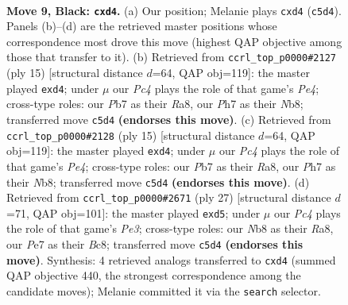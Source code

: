 \documentclass[11pt]{article}
\begin{document}
\clearpage

\begin{figure}[p]\centering
\begin{subfigure}{0.46\textwidth}\centering
\resizebox{\linewidth}{!}{%
\newchessgame
\chessboard[
  setfen={rnbqk2r/pp2p1bp/5pp1/2p5/3PPPPP/2P5/P7/R1BQKBNR b KQkq - 0 9},
  showmover=false,
  pgfstyle=straightmove, color=movearrow, markmove={c5-d4}
]}
\caption{}
\end{subfigure}\hfill
\begin{subfigure}{0.46\textwidth}\centering
\resizebox{\linewidth}{!}{%
\newchessgame
\chessboard[
  setfen={rn1qkb1r/pbp2ppp/1p6/4p3/2BPP3/2P2P2/P5PP/R1BQK1NR b KQkq - 1 8},
  showmover=false,
  pgfstyle=straightmove, color=movearrow, markmove={e5-d4}
]}
\caption{}
\end{subfigure}
\\[4pt]
\begin{subfigure}{0.46\textwidth}\centering
\resizebox{\linewidth}{!}{%
\newchessgame
\chessboard[
  setfen={rn1qkb1r/pbp2ppp/1p6/4p3/2BPP3/2P2P2/P5PP/R1BQK1NR b KQkq - 1 8},
  showmover=false,
  pgfstyle=straightmove, color=movearrow, markmove={e5-d4}
]}
\caption{}
\end{subfigure}\hfill
\begin{subfigure}{0.46\textwidth}\centering
\resizebox{\linewidth}{!}{%
\newchessgame
\chessboard[
  setfen={r1bq1rk1/ppb2p1p/4p1p1/2pP4/4PP2/2P5/P2QB1PP/1RB2RK1 b - - 2 14},
  showmover=false,
  pgfstyle=straightmove, color=movearrow, markmove={e6-d5}
]}
\caption{}
\end{subfigure}
\caption{\textbf{Move 9, Black: \texttt{cxd4}.} (a) Our position; Melanie plays \texttt{cxd4} (\texttt{c5d4}). Panels (b)--(d) are the retrieved master positions whose correspondence most drove this move (highest QAP objective among those that transfer to it). (b) Retrieved from \texttt{ccrl\_top\_p0000\#2127} (ply 15) [structural distance $d$=64, QAP obj=119]: the master played \texttt{exd4}; under $\mu$ our \emph{Pc4} plays the role of that game's \emph{Pe4}; cross-type roles: our \emph{P}b7 as their \emph{R}a8, our \emph{P}h7 as their \emph{N}b8; transferred move \texttt{c5d4} \textbf{(endorses this move)}. (c) Retrieved from \texttt{ccrl\_top\_p0000\#2128} (ply 15) [structural distance $d$=64, QAP obj=119]: the master played \texttt{exd4}; under $\mu$ our \emph{Pc4} plays the role of that game's \emph{Pe4}; cross-type roles: our \emph{P}b7 as their \emph{R}a8, our \emph{P}h7 as their \emph{N}b8; transferred move \texttt{c5d4} \textbf{(endorses this move)}. (d) Retrieved from \texttt{ccrl\_top\_p0000\#2671} (ply 27) [structural distance $d$=71, QAP obj=101]: the master played \texttt{exd5}; under $\mu$ our \emph{Pc4} plays the role of that game's \emph{Pe3}; cross-type roles: our \emph{N}b8 as their \emph{R}a8, our \emph{P}e7 as their \emph{B}c8; transferred move \texttt{c5d4} \textbf{(endorses this move)}. Synthesis: 4 retrieved analogs transferred to \texttt{cxd4} (summed QAP objective 440, the strongest correspondence among the candidate moves); Melanie committed it via the \texttt{search} selector.}
\label{fig:thought-m17}
\end{figure}
\end{document}
